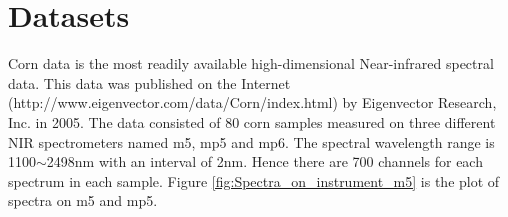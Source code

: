 \documentclass[a4paper,12pt,titlepage]{article} %
\numberwithin{equation}{section}  %
\begin{document}
	
	\section{Datasets}
	\label{sec:data}
	
	Corn data is the most readily available high-dimensional Near-infrared spectral data. This data was published on the Internet (http://www.eigenvector.com/data/Corn/index.html) by Eigenvector Research, Inc. in 2005. The data consisted of 80 corn samples measured on three different NIR spectrometers named m5, mp5 and mp6. The spectral wavelength range is 1100$\sim$2498nm with an interval of 2nm. Hence there are 700 channels for each spectrum in each sample. Figure \ref{fig:Spectra_on_instrument_m5} is the plot of spectra on m5 and mp5.
	
\end{document}
